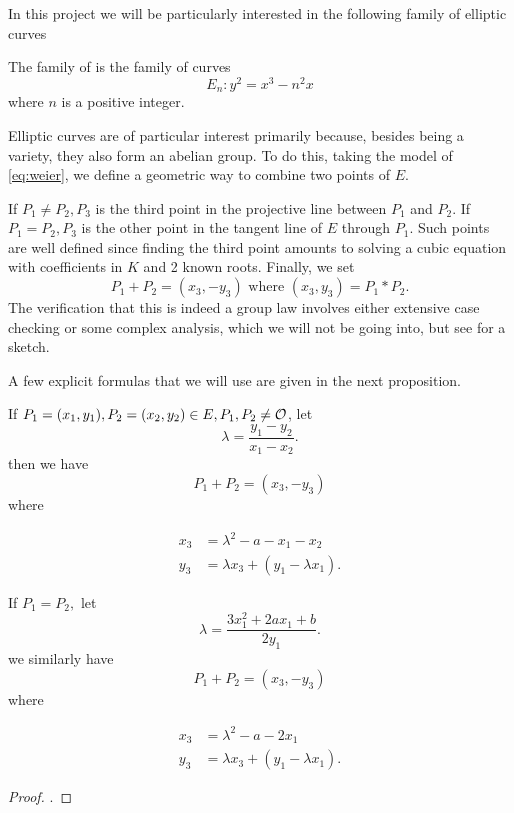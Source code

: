 \documentclass[12pt, a4paper]{amsart}
\begin{document}
In this project we will be particularly interested in the following family
of elliptic curves

\begin{defn}
  The family of  is the family of curves
  \begin{equation} \label{eq:twist}
    E_n : y^2 = x^3 - n^2 x
  \end{equation}
  where $n$ is a positive integer.
\end{defn}

Elliptic curves are of particular interest primarily because, besides being
a variety, they also form an abelian group. To do this, taking the model of
\autoref{eq:weier}, we define a geometric way to combine two points of $E$.

If $P_1 \neq P_2, P_3$ is the third point in the projective line between $P_1$
and $P_2$. If $P_1 = P_2, P_3$ is the other point in the tangent line of $E$
through $P_1$.
Such points are well defined since finding the third point amounts to solving
a cubic equation with coefficients in $K$ and 2 known roots.
Finally, we set
\[P_1 + P_2 = (x_3, -y_3) \text{ where } (x_3,y_3) = P_1 * P_2.\]
The verification that this is indeed a  group law involves either
extensive case checking or
some complex analysis, which we will not be going into, but see
\cite[129-137]{Granville} for a sketch.

A few explicit formulas that we will use are given in the next proposition. 

\begin{prop}
  If $P_1 = (x_1,y_1), P_2 = (x_2,y_2) \in E, P_1, P_2 \neq {\mathcal O}$, let
  $$\lambda = \frac{y_1-y_2}{x_1-x_2}.$$
  then we have
  \[P_1 + P_2 = (x_3,-y_3)\]
  where

  \begin{equation} \label{eq:adddiff}
    \begin{split}
      x_3 &= \lambda^2 - a - x_1 - x_2 \\
      y_3 &= \lambda x_3 + (y_1 - \lambda x_1).
    \end{split}
  \end{equation}

  If $P_1 = P_2,$ let
  \[\lambda = \frac{3x_1^2 + 2ax_1 + b}{2y_1}.\]
  we similarly have
  \[P_1 + P_2 = (x_3,-y_3)\]
  where
  
  \begin{equation} \label {eq:addsim}
    \begin{split}
      x_3 &= \lambda^2 - a - 2x_1 \\
      y_3 &= \lambda x_3 + (y_1 - \lambda x_1).
    \end{split}
  \end{equation}
\end{prop}
\begin{proof}
  \cite[See][Chapter 1.7, page 34]{modular}.
\end{proof}
\end{document}
